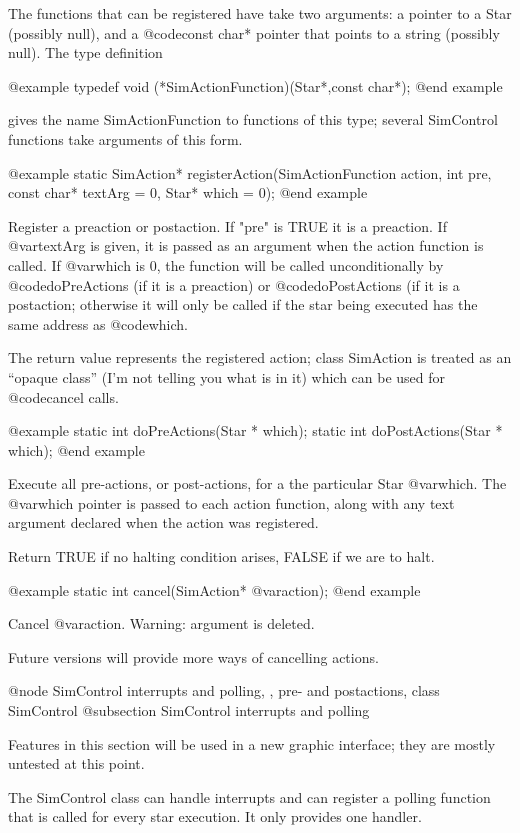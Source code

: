 The functions that can be registered have take two arguments: a
pointer to a Star (possibly null), and a @code{const char*} pointer
that points to a string (possibly null).  The type definition

@example
typedef void (*SimActionFunction)(Star*,const char*);
@end example

gives the name SimActionFunction to functions of this type;
several SimControl functions take arguments of this form.

@example
static SimAction* registerAction(SimActionFunction action, int pre,
 const char* textArg = 0, Star* which = 0);
@end example

Register a preaction or postaction.  If "pre" is TRUE it is a preaction.
If @var{textArg} is given, it is passed as an argument when the
action function is called.  If @var{which} is 0, the function will
be called unconditionally by @code{doPreActions} (if it is a preaction)
or @code{doPostActions} (if it is a postaction; otherwise it will
only be called if the star being executed has the same address as
@code{which}.

The return value represents the registered action; class SimAction
is treated as an ``opaque class'' (I'm not telling you what is in it)
which can be used for @code{cancel} calls.

@example
static int doPreActions(Star * which);
static int doPostActions(Star * which);
@end example

Execute all pre-actions, or post-actions, for a the particular Star
@var{which}.  The @var{which} pointer is passed to each action
function, along with any text argument declared when the action
was registered.

Return TRUE if no halting condition arises, FALSE if we are to halt.

@example
static int cancel(SimAction* @var{action});
@end example

Cancel @var{action}.  Warning: argument is deleted.

Future versions will provide more ways of cancelling actions.

@node SimControl interrupts and polling,  , pre- and postactions, class SimControl
@subsection SimControl interrupts and polling

Features in this section will be used in a new graphic interface;
they are mostly untested at this point.

The SimControl class can handle interrupts and can register a
polling function that is called for every star execution.
It only provides one handler.

